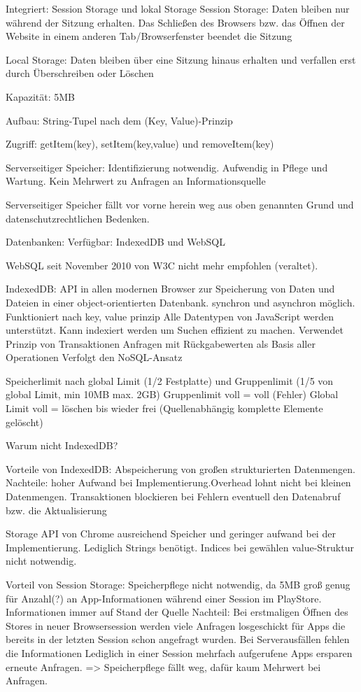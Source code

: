 Integriert: Session Storage und lokal Storage
Session Storage: Daten bleiben nur während der Sitzung erhalten. Das Schließen des Browsers bzw. das Öffnen der Website in einem anderen Tab/Browserfenster beendet die Sitzung

Local Storage: Daten bleiben über eine Sitzung hinaus erhalten und verfallen erst durch Überschreiben oder Löschen

Kapazität: 5MB

Aufbau: String-Tupel nach dem (Key, Value)-Prinzip

Zugriff: getItem(key), setItem(key,value) und removeItem(key)


Serverseitiger Speicher:
Identifizierung notwendig. Aufwendig in Pflege und Wartung. Kein Mehrwert zu Anfragen an Informationsquelle

Serverseitiger Speicher fällt vor vorne herein weg aus oben genannten Grund und datenschutzrechtlichen Bedenken.


Datenbanken:
Verfügbar: IndexedDB und WebSQL

WebSQL seit November 2010 von W3C nicht mehr empfohlen (veraltet).

IndexedDB: API in allen modernen Browser zur Speicherung von Daten und Dateien in einer object-orientierten Datenbank.
synchron und asynchron möglich.
Funktioniert nach key, value prinzip
Alle Datentypen von JavaScript werden unterstützt.
Kann indexiert werden um Suchen effizient zu machen.
Verwendet Prinzip von Transaktionen
Anfragen mit Rückgabewerten als Basis aller Operationen
Verfolgt den NoSQL-Ansatz


Speicherlimit nach global Limit (1/2 Festplatte) und Gruppenlimit (1/5 von global Limit, min 10MB max. 2GB)
Gruppenlimit voll = voll (Fehler)
Global Limit voll = löschen bis wieder frei (Quellenabhängig komplette Elemente gelöscht)

Warum nicht IndexedDB?

Vorteile von IndexedDB: Abspeicherung von großen strukturierten Datenmengen.
Nachteile: hoher Aufwand bei Implementierung.Overhead lohnt nicht bei kleinen Datenmengen. Transaktionen blockieren bei Fehlern  eventuell den Datenabruf bzw. die Aktualisierung

Storage API von Chrome ausreichend Speicher und geringer aufwand bei der Implementierung. Lediglich Strings benötigt. Indices bei gewählen value-Struktur nicht notwendig.

Vorteil von Session Storage: Speicherpflege nicht notwendig, da 5MB groß genug für Anzahl(?) an App-Informationen während einer Session im PlayStore. Informationen immer auf Stand der Quelle
Nachteil: Bei erstmaligen Öffnen des Stores in neuer Browsersession werden viele Anfragen losgeschickt für Apps die bereits in der letzten Session schon angefragt wurden. Bei Serverausfällen fehlen die Informationen
Lediglich in einer Session mehrfach aufgerufene Apps ersparen erneute Anfragen.
=> Speicherpflege fällt weg, dafür kaum Mehrwert bei Anfragen.


